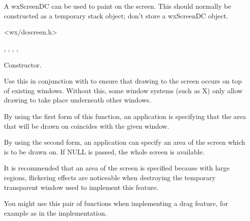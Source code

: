 \section{}\label{wxscreendc}

A wxScreenDC can be used to paint on the screen.
This should normally be constructed as a temporary stack object; don't store
a wxScreenDC object.




<wx/dcscreen.h>


, , ,\rtfsp
{}, 


\label{wxscreendcctor}


Constructor.

\label{wxscreendcstartdrawingontop}



Use this in conjunction with  to
ensure that drawing to the screen occurs on top of existing windows. Without this,
some window systems (such as X) only allow drawing to take place underneath
other windows.

By using the first form of this function, an application is specifying that
the area that will be drawn on coincides with the given window.

By using the second form, an application can specify an area of the screen
which is to be drawn on. If NULL is passed, the whole screen is available.

It is recommended that an area of the screen is specified because with large regions,
flickering effects are noticeable when destroying the temporary transparent window used
to implement this feature.

You might use this pair of functions when implementing a drag feature, for example
as in the  implementation.

